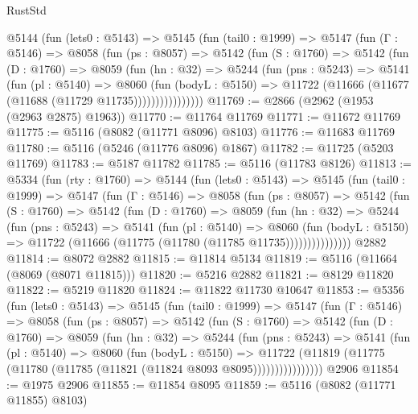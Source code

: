 \begin{lexlean}{RustStd}
\begin{coremodule}
{\begin{coremodule}
{{{{{{{{{{{{{{{{{{{{{{{{{{{{{{{      @5144
        (fun (lets0 : @5143) =>
        @5145
          (fun (tail0 : @1999) =>
          @5147
            (fun (Γ : @5146) =>
            @8058
              (fun (ps : @8057) =>
              @5142
                (fun (S : @1760) =>
                @5142
                  (fun (D : @1760) =>
                  @8059
                    (fun (hn : @32) =>
                    @5244
                      (fun (pns : @5243) =>
                      @5141
                        (fun (pl : @5140) =>
                        @8060
                          (fun (bodyL : @5150) =>
                          @11722 (@11666 (@11677 (@11688 (@11729 @11735))))))))))))))))
@11769 := @2866 (@2962 (@1953 (@2963 @2875) @1963))
@11770 := @11764 @11769
@11771 := @11672 @11769
@11775 := @5116 (@8082 (@11771 @8096) @8103)
@11776 := @11683 @11769
@11780 := @5116 (@5246 (@11776 @8096) @1867)
@11782 := @11725 (@5203 @11769)
@11783 := @5187 @11782
@11785 := @5116 (@11783 @8126)
@11813 := @5334
    (fun (rty : @1760) =>
    @5144
      (fun (lets0 : @5143) =>
      @5145
        (fun (tail0 : @1999) =>
        @5147
          (fun (Γ : @5146) =>
          @8058
            (fun (ps : @8057) =>
            @5142
              (fun (S : @1760) =>
              @5142
                (fun (D : @1760) =>
                @8059
                  (fun (hn : @32) =>
                  @5244
                    (fun (pns : @5243) =>
                    @5141
                      (fun (pl : @5140) =>
                      @8060
                        (fun (bodyL : @5150) =>
                        @11722 (@11666 (@11775 (@11780 (@11785 @11735)))))))))))))))
    @2882
@11814 := @8072 @2882
@11815 := @11814 @5134
@11819 := @5116 (@11664 (@8069 (@8071 @11815)))
@11820 := @5216 @2882
@11821 := @8129 @11820
@11822 := @5219 @11820
@11824 := @11822 @11730 @10647
@11853 := @5356
    (fun (lets0 : @5143) =>
    @5145
      (fun (tail0 : @1999) =>
      @5147
        (fun (Γ : @5146) =>
        @8058
          (fun (ps : @8057) =>
          @5142
            (fun (S : @1760) =>
            @5142
              (fun (D : @1760) =>
              @8059
                (fun (hn : @32) =>
                @5244
                  (fun (pns : @5243) =>
                  @5141
                    (fun (pl : @5140) =>
                    @8060
                      (fun (bodyL : @5150) =>
                      @11722
                        (@11819 (@11775 (@11780 (@11785 (@11821 (@11824 @8093 @8095))))))))))))))))
    @2906
@11854 := @1975 @2906
@11855 := @11854 @8095
@11859 := @5116 (@8082 (@11771 @11855) @8103)
}}}}}}}}}}}}}}}}}}}}}}}}}}}}}}}
\end{coremodule}}
\end{coremodule}
\end{lexlean}
